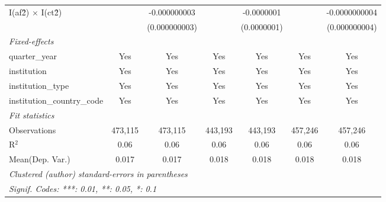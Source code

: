 \begin{tabular}{lcccccc}
   I(af\^2) $\times$ I(ct\^2)         &                & -0.000000003    &                & -0.0000001      &                & -0.0000000004\\   
                                      &                & (0.000000003)   &                & (0.0000001)     &                & (0.000000004)\\   
   \midrule
   \emph{Fixed-effects}\\
   quarter\_year                      & Yes            & Yes             & Yes            & Yes             & Yes            & Yes\\  
   institution                        & Yes            & Yes             & Yes            & Yes             & Yes            & Yes\\  
   institution\_type                  & Yes            & Yes             & Yes            & Yes             & Yes            & Yes\\  
   institution\_country\_code         & Yes            & Yes             & Yes            & Yes             & Yes            & Yes\\  
   \midrule
   \emph{Fit statistics}\\
   Observations                       & 473,115        & 473,115         & 443,193        & 443,193         & 457,246        & 457,246\\  
   R$^2$                              & 0.06           & 0.06            & 0.06           & 0.06            & 0.06           & 0.06\\  
Mean(Dep. Var.) & 0.017 & 0.017 & 0.018 & 0.018 & 0.018 & 0.018 \\
   \midrule \midrule
   \multicolumn{7}{l}{\emph{Clustered (author) standard-errors in parentheses}}\\
   \multicolumn{7}{l}{\emph{Signif. Codes: ***: 0.01, **: 0.05, *: 0.1}}\\
\end{tabular}
\par\endgroup
